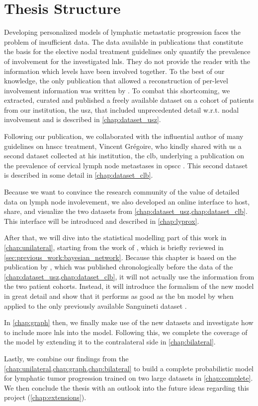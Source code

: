 \documentclass[\relativeRoot/main.tex]{subfiles}
\begin{document}
\section{Thesis Structure}
\label{sec:intro:structure}

Developing personalized models of lymphatic metastatic progression faces the problem of insufficient data. The data available in publications that constitute the basis for the elective nodal treatment guidelines only quantify the prevalence of involvement for the investigated \glspl{lnl}. They do not provide the reader with the information which levels have been involved together. To the best of our knowledge, the only publication that allowed a reconstruction of per-level involvement information was written by . To combat this shortcoming, we extracted, curated and published a freely available dataset on a cohort of patients from our institution, the \gls{usz}, that included unprecedented detail w.r.t. nodal involvement and is described in \cref{chap:dataset_usz}.

Following our publication, we collaborated with the influential author of many guidelines on \gls{hnscc} treatment, Vincent Grégoire, who kindly shared with us a second dataset collected at his institution, the \gls{clb}, underlying a publication on the prevalence of cervical lymph node metastases in \gls{opscc} \cite{bauwens_prevalence_2021}. This second dataset is described in some detail in \cref{chap:dataset_clb}.

Because we want to convince the research community of the value of detailed data on lymph node involevement, we also developed an online interface to host, share, and visualize the two datasets from \cref{chap:dataset_usz,chap:dataset_clb}. This interface will be introduced and described in \cref{chap:lyprox}.

After that, we will dive into the statistical modelling part of this work in \cref{chap:unilateral}, starting from the  work of , which is briefly reviewed in \cref{sec:previous_work:bayesian_network}. Because this chapter is based on the publication by , which was published chronologically before the data of the \cref{chap:dataset_usz,chap:dataset_clb}, it will not actually use the information from the two patient cohorts. Instead, it will introduce the formalism of the new model in great detail and show that it performs as good as the \gls{bn} model by  when applied to the only previously available Sanguineti dataset \cite{sanguineti_defining_2009}.

In \cref{chap:graph} then, we finally make use of the new datasets and investigate how to include more \glspl{lnl} into the model. Following this, we complete the coverage of the model by extending it to the contralateral side in \cref{chap:bilateral}.

Lastly, we combine our findings from the \cref{chap:unilateral,chap:graph,chap:bilateral} to build a complete probabilistic model for lymphatic tumor progression trained on two large datasets in \cref{chap:complete}. We then conclude the thesis with an outlook into the future ideas regarding this project (\cref{chap:extensions}).
\end{document}

